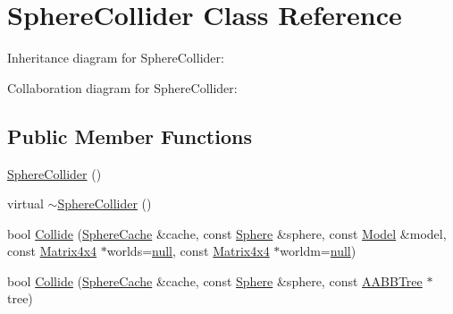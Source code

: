 \hypertarget{class_sphere_collider}{\section{Sphere\+Collider Class Reference}
\label{class_sphere_collider}
}


Inheritance diagram for Sphere\+Collider\+:


Collaboration diagram for Sphere\+Collider\+:
\subsection*{Public Member Functions}
\begin{DoxyCompactItemize}
\item 
\hyperlink{class_sphere_collider_af46ca28e45d8efa559f097aadfb9bc44}{Sphere\+Collider} ()
\item 
virtual \hyperlink{class_sphere_collider_ac3f355cae4d6cbd988bf7b4ea74b5472}{$\sim$\+Sphere\+Collider} ()
\item 
bool \hyperlink{class_sphere_collider_ad5c6c1a0fb1ea0377b5d6a89a8b5c54b}{Collide} (\hyperlink{struct_sphere_cache}{Sphere\+Cache} \&cache, const \hyperlink{class_sphere}{Sphere} \&sphere, const \hyperlink{class_model}{Model} \&model, const \hyperlink{class_matrix4x4}{Matrix4x4} $\ast$worlds=\hyperlink{_ice_types_8h_ac97b8ee753e4405397a42ad5799b0f9e}{null}, const \hyperlink{class_matrix4x4}{Matrix4x4} $\ast$worldm=\hyperlink{_ice_types_8h_ac97b8ee753e4405397a42ad5799b0f9e}{null})
\item 
bool \hyperlink{class_sphere_collider_a3f0d0ed9663d0c39c75f54b4ed4568ce}{Collide} (\hyperlink{struct_sphere_cache}{Sphere\+Cache} \&cache, const \hyperlink{class_sphere}{Sphere} \&sphere, const \hyperlink{class_a_a_b_b_tree}{A\+A\+B\+B\+Tree} $\ast$tree)
\end{DoxyCompactItemize}
